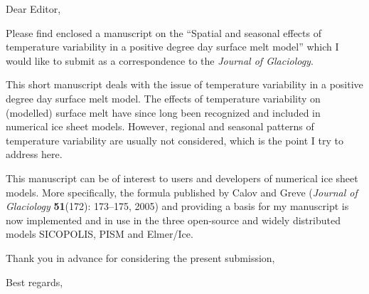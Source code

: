 \documentclass{letter}
\begin{document}
\begin{letter}{}

\opening{Dear Editor,}

Please find enclosed a manuscript on the ``Spatial and seasonal effects of temperature variability in a positive degree day surface melt model'' which I would like to submit as a correspondence to the \emph{Journal of Glaciology}.

This short manuscript deals with the issue of temperature variability in a positive degree day surface melt model. The effects of temperature variability on (modelled) surface melt have since long been recognized and included in numerical ice sheet models. However, regional and seasonal patterns of temperature variability are usually not considered, which is the point I try to address here.

This manuscript can be of interest to users and developers of numerical ice sheet models. More specifically, the formula published by Calov and Greve (\emph{Journal of Glaciology} \textbf{51}(172): 173--175, 2005) and providing a basis for my manuscript is now implemented and in use in the three open-source and widely distributed models SICOPOLIS, PISM and Elmer/Ice.

Thank you in advance for considering the present submission,

\closing{Best regards,}

\end{letter}
\end{document}
